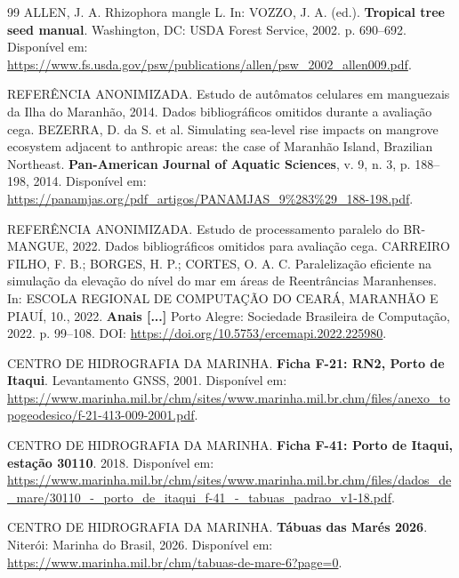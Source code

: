 \documentclass[12pt,a4paper]{article}
\begin{document}
\FloatBarrier
\begin{thebibliography}{99}
ALLEN, J. A. Rhizophora mangle L. In: VOZZO, J. A. (ed.). \textbf{Tropical tree seed manual}. Washington, DC: USDA Forest Service, 2002. p. 690--692. Disponível em: \url{https://www.fs.usda.gov/psw/publications/allen/psw_2002_allen009.pdf}.

\ifdefined\VersaoCega
{}
REFERÊNCIA ANONIMIZADA. Estudo de autômatos celulares em manguezais da Ilha do Maranhão, 2014. Dados bibliográficos omitidos durante a avaliação cega.
\else
{}
BEZERRA, D. da S. et al. Simulating sea-level rise impacts on mangrove ecosystem adjacent to anthropic areas: the case of Maranhão Island, Brazilian Northeast. \textbf{Pan-American Journal of Aquatic Sciences}, v. 9, n. 3, p. 188--198, 2014. Disponível em: \url{https://panamjas.org/pdf_artigos/PANAMJAS_9%283%29_188-198.pdf}.
\fi

\ifdefined\VersaoCega
{}
REFERÊNCIA ANONIMIZADA. Estudo de processamento paralelo do BR-MANGUE, 2022. Dados bibliográficos omitidos para avaliação cega.
\else
{}
CARREIRO FILHO, F. B.; BORGES, H. P.; CORTES, O. A. C. Paralelização eficiente na simulação da elevação do nível do mar em áreas de Reentrâncias Maranhenses. In: ESCOLA REGIONAL DE COMPUTAÇÃO DO CEARÁ, MARANHÃO E PIAUÍ, 10., 2022. \textbf{Anais [...]} Porto Alegre: Sociedade Brasileira de Computação, 2022. p. 99--108. DOI: \url{https://doi.org/10.5753/ercemapi.2022.225980}.
\fi

CENTRO DE HIDROGRAFIA DA MARINHA. \textbf{Ficha F-21: RN2, Porto de Itaqui}. Levantamento GNSS, 2001. Disponível em: \url{https://www.marinha.mil.br/chm/sites/www.marinha.mil.br.chm/files/anexo_topogeodesico/f-21-413-009-2001.pdf}.

CENTRO DE HIDROGRAFIA DA MARINHA. \textbf{Ficha F-41: Porto de Itaqui, estação 30110}. 2018. Disponível em: \url{https://www.marinha.mil.br/chm/sites/www.marinha.mil.br.chm/files/dados_de_mare/30110_-_porto_de_itaqui_f-41_-_tabuas_padrao_v1-18.pdf}.

CENTRO DE HIDROGRAFIA DA MARINHA. \textbf{Tábuas das Marés 2026}. Niterói: Marinha do Brasil, 2026. Disponível em: \url{https://www.marinha.mil.br/chm/tabuas-de-mare-6?page=0}.


\end{thebibliography}
\end{document}
